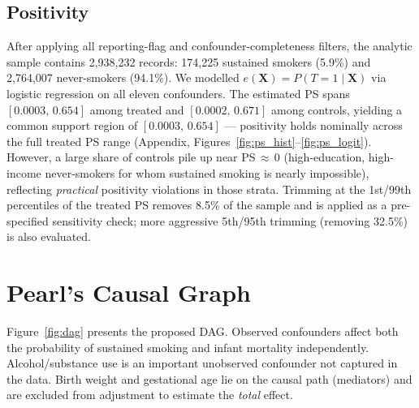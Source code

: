\documentclass[11pt]{article}
\begin{document}
\subsection{Positivity}
After applying all reporting-flag and confounder-completeness filters, the analytic sample contains 2,938,232 records: 174,225 sustained smokers (5.9\%) and 2,764,007 never-smokers (94.1\%). We modelled $e(\mathbf{X})=P(T=1\mid\mathbf{X})$ via logistic regression on all eleven confounders. The estimated PS spans $[0.0003,\,0.654]$ among treated and $[0.0002,\,0.671]$ among controls, yielding a common support region of $[0.0003,\,0.654]$ --- positivity holds nominally across the full treated PS range (Appendix, Figures~\ref{fig:ps_hist}--\ref{fig:ps_logit}). However, a large share of controls pile up near PS\,$\approx$\,0 (high-education, high-income never-smokers for whom sustained smoking is nearly impossible), reflecting \emph{practical} positivity violations in those strata. Trimming at the 1st/99th percentiles of the treated PS removes 8.5\% of the sample and is applied as a pre-specified sensitivity check; more aggressive 5th/95th trimming (removing 32.5\%) is also evaluated.

\section{Pearl's Causal Graph}

Figure~\ref{fig:dag} presents the proposed DAG. Observed confounders affect both the probability of sustained smoking and infant mortality independently. Alcohol/substance use is an important unobserved confounder not captured in the data. Birth weight and gestational age lie on the causal path (mediators) and are excluded from adjustment to estimate the \emph{total} effect.
\end{document}
